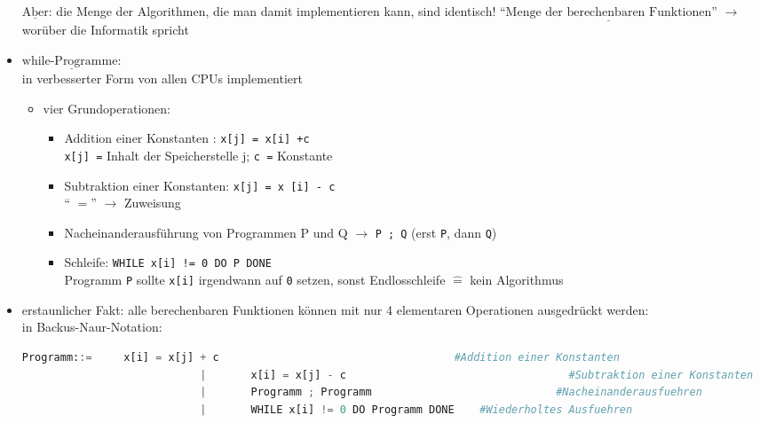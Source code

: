 \documentclass[11pt, fleqn]{scrreprt}
\begin{document}
\begin{itemize}[label={–}]
	$\underline{\text{Aber}}$: die Menge der Algorithmen, die man damit implementieren kann, sind identisch!
	``$\underline{\text{Menge der berechenbaren Funktionen}}$'' $\rightarrow$ worüber die Informatik spricht



	\item $\underline{\text{while-Programme:}}$ \\
		in verbesserter Form von allen CPUs implementiert
	\begin{itemize}[label={-}]
		\item vier Grundoperationen:
		\begin{itemize}
			\item Addition einer Konstanten : \verb|x[j] = x[i] +c| \\
			\verb|x[j] =| Inhalt der Speicherstelle j; \verb|c =| Konstante
			\item Subtraktion einer Konstanten: \verb|x[j] = x [i] - c| \\
			 `` $=$'' $\rightarrow$ Zuweisung
			\item Nacheinanderausführung von Programmen P und Q $\rightarrow$ \verb|P ; Q| (erst \verb|P|, dann \verb|Q|)
			\item Schleife:  \verb|WHILE x[i] != 0 DO P DONE| \\
			Programm \verb|P| sollte \verb|x[i]| irgendwann auf \verb|0| setzen, sonst Endlosschleife $\widehat{=}$ kein Algorithmus
		\end{itemize}
	\end{itemize}


	\item erstaunlicher Fakt: alle berechenbaren Funktionen können mit nur 4 elementaren Operationen ausgedrückt werden: \\
	in Backus-Naur-Notation: 
	

	\begin{lstlisting}[language=Python]
		Programm::= 	x[i] = x[j] + c										#Addition einer Konstanten
							|		x[i] = x[j] - c									  #Subtraktion einer Konstanten
							|		Programm ; Programm  							#Nacheinanderausfuehren
							|		WHILE x[i] != 0 DO Programm DONE 	#Wiederholtes Ausfuehren
	\end{lstlisting}



\end{itemize}
\end{document}
